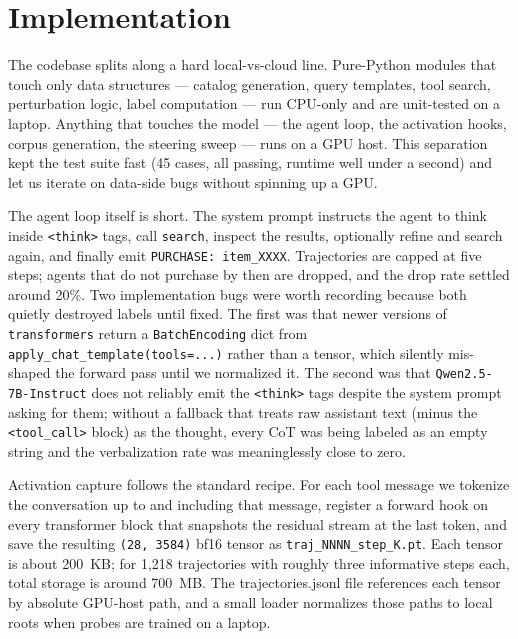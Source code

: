 \documentclass[11pt]{article}
\begin{document}
\section{Implementation}

The codebase splits along a hard local-vs-cloud line. Pure-Python modules
that touch only data structures --- catalog generation, query templates,
tool search, perturbation logic, label computation --- run CPU-only and are
unit-tested on a laptop. Anything that touches the model --- the agent loop,
the activation hooks, corpus generation, the steering sweep --- runs on
a GPU host. This separation kept the test suite fast (45 cases, all passing,
runtime well under a second) and let us iterate on data-side bugs without
spinning up a GPU.

The agent loop itself is short. The system prompt instructs the agent to
think inside \texttt{<think>} tags, call \texttt{search}, inspect the
results, optionally refine and search again, and finally emit
\texttt{PURCHASE: item\_XXXX}. Trajectories are capped at five steps;
agents that do not purchase by then are dropped, and the drop rate settled
around 20\%. Two implementation bugs were worth recording because both
quietly destroyed labels until fixed. The first was that newer versions of
\texttt{transformers} return a \texttt{BatchEncoding} dict from
\texttt{apply\_chat\_template(tools=...)} rather than a tensor, which
silently mis-shaped the forward pass until we normalized it. The second was
that \texttt{Qwen2.5-7B-Instruct} does not reliably emit the
\texttt{<think>} tags despite the system prompt asking for them; without a
fallback that treats raw assistant text (minus the \texttt{<tool\_call>}
block) as the thought, every CoT was being labeled as an empty string and
the verbalization rate was meaninglessly close to zero.

Activation capture follows the standard recipe. For each tool message we
tokenize the conversation up to and including that message, register a
forward hook on every transformer block that snapshots the residual stream
at the last token, and save the resulting \texttt{(28, 3584)} bf16 tensor as
\texttt{traj\_NNNN\_step\_K.pt}. Each tensor is about 200~KB; for 1{,}218
trajectories with roughly three informative steps each, total storage is
around 700~MB. The trajectories.jsonl file references each tensor by
absolute GPU-host path, and a small loader normalizes those paths to local
roots when probes are trained on a laptop.
\end{document}
